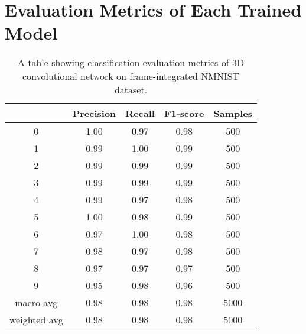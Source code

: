 \appendix
\chapter{Evaluation Metrics of Each Trained Model}

\begin{table}[htb]
    \centering
    \begin{tabular}{|| c | c | c | c | c ||}
        \hline
             & Precision & Recall & F1-score & Samples \\
        \hline \hline
        0            & 1.00  & 0.97  & 0.98 & 500 \\
        \hline
        1            & 0.99  & 1.00  & 0.99 & 500 \\
        \hline
        2            & 0.99  & 0.99  & 0.99 & 500 \\
        \hline
        3            & 0.99  & 0.99  & 0.99 & 500 \\
        \hline
        4            & 0.99  & 0.97  & 0.98 & 500 \\
        \hline
        5            & 1.00  & 0.98  & 0.99 & 500 \\
        \hline
        6            & 0.97  & 1.00  & 0.98 & 500 \\
        \hline
        7            & 0.98  & 0.97  & 0.98 & 500 \\
        \hline
        8            & 0.97  & 0.97  & 0.97 & 500 \\
        \hline
        9            & 0.95  & 0.98  & 0.96 & 500 \\
        \hline
        macro avg    & 0.98  & 0.98  & 0.98 & 5000 \\
        \hline
        weighted avg & 0.98  & 0.98  & 0.98 & 5000 \\
        \hline
    \end{tabular}
    \caption{A table showing classification evaluation metrics of 3D convolutional network on frame-integrated NMNIST dataset.}
    \label{tab:conv3d_nmnist_evaluation_metrics}
\end{table}

